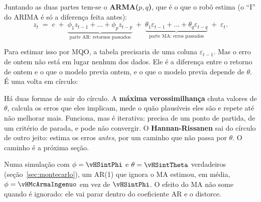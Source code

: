 \documentclass[11pt,a4paper]{article}
\begin{document}
Juntando as duas partes tem-se o \textbf{ARMA($p,q$)}, que é o que o robô estima (o ``I'' do ARIMA é só a diferença
feita antes):
\[
  z_t \;=\; c \;+\; \underbrace{\phi_1 z_{t-1} + \dots + \phi_p z_{t-p}}_{\text{parte AR: retornos passados}}
  \;+\; \underbrace{\theta_1 \varepsilon_{t-1} + \dots + \theta_q \varepsilon_{t-q}}_{\text{parte MA: erros passados}}
  \;+\; \varepsilon_t .
\]

Para estimar isso por MQO, a tabela precisaria de uma coluna $\varepsilon_{t-1}$. Mas o erro de ontem não está em
lugar nenhum dos dados. Ele é a diferença entre o retorno de ontem e o que o modelo previa ontem, e o que o modelo
previa depende de $\theta$. É uma volta em círculo:

\begin{center}
\end{center}

Há duas formas de sair do círculo. A \textbf{máxima verossimilhança} chuta valores de $\theta$, calcula os erros que
eles implicam, mede o quão plausíveis eles são e repete até não melhorar mais. Funciona, mas é iterativa: precisa de
um ponto de partida, de um critério de parada, e pode não convergir. O \textbf{Hannan-Rissanen} sai do círculo de outro
jeito: estima os erros \emph{antes}, por um caminho que não passa por $\theta$. O caminho é a próxima seção.

\begin{cuidado}
Numa simulação com $\phi = \vHSintPhi$ e $\theta = \vHSintTheta$ verdadeiros (seção~\ref{sec:montecarlo}), um AR(1) que ignora
o MA estimou, em média, $\phi = \vHMcArmaIngenuo$ em vez de $\vHSintPhi$. O efeito do MA não some quando é ignorado: ele vai
parar dentro do coeficiente AR e o distorce.
\end{cuidado}
\end{document}
